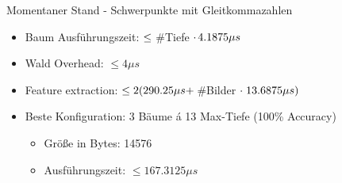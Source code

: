\documentclass[10pt]{beamer}
\begin{document}
\begin{frame}{Momentaner Stand - Schwerpunkte mit Gleitkommazahlen}
\begin{itemize}
    \item Baum Ausführungszeit: $\leq \hspace{0.1cm}$\#Tiefe$\hspace{0.1cm}\cdot \hspace{0.05cm} 4.1875 \mu s$
    \item Wald Overhead: $\leq 4\mu s$
    \item Feature extraction: $\leq 2(290.25\mu s + \hspace{0.05cm} $\#Bilder $ \cdot \hspace{0.1cm} 13.6875 \mu s)$
    \item Beste Konfiguration: 3 Bäume á 13 Max-Tiefe (100\% Accuracy)
    \begin{itemize}
        \item Größe in Bytes: 14576
        \item Ausführungszeit: $\leq 167.3125 \mu s$
    \end{itemize}
\end{itemize}
\end{frame}
\end{document}
